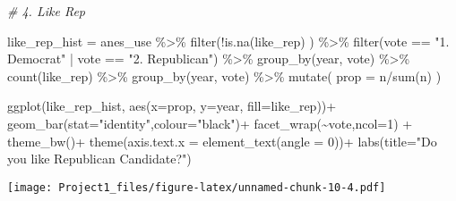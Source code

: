 \documentclass[
]{article}
\newenvironment{Shaded}{\begin{snugshade}}{\end{snugshade}}
\newcommand{\AttributeTok}[1]{\textcolor[rgb]{0.77,0.63,0.00}{#1}}
\newcommand{\CommentTok}[1]{\textcolor[rgb]{0.56,0.35,0.01}{\textit{#1}}}
\newcommand{\DecValTok}[1]{\textcolor[rgb]{0.00,0.00,0.81}{#1}}
\newcommand{\FunctionTok}[1]{\textcolor[rgb]{0.00,0.00,0.00}{#1}}
\newcommand{\NormalTok}[1]{#1}
\newcommand{\OtherTok}[1]{\textcolor[rgb]{0.56,0.35,0.01}{#1}}
\newcommand{\SpecialCharTok}[1]{\textcolor[rgb]{0.00,0.00,0.00}{#1}}
\newcommand{\StringTok}[1]{\textcolor[rgb]{0.31,0.60,0.02}{#1}}
\begin{document}
\begin{Shaded}
\begin{Highlighting}[]
\CommentTok{\# 4. Like Rep}

\NormalTok{like\_rep\_hist }\OtherTok{=}\NormalTok{ anes\_use }\SpecialCharTok{\%\textgreater{}\%}
  \FunctionTok{filter}\NormalTok{(}\SpecialCharTok{!}\FunctionTok{is.na}\NormalTok{(like\_rep) ) }\SpecialCharTok{\%\textgreater{}\%}
  \FunctionTok{filter}\NormalTok{(vote }\SpecialCharTok{==} \StringTok{"1. Democrat"} \SpecialCharTok{|}\NormalTok{ vote }\SpecialCharTok{==} \StringTok{"2. Republican"}\NormalTok{) }\SpecialCharTok{\%\textgreater{}\%}
  \FunctionTok{group\_by}\NormalTok{(year, vote) }\SpecialCharTok{\%\textgreater{}\%}
  \FunctionTok{count}\NormalTok{(like\_rep) }\SpecialCharTok{\%\textgreater{}\%}
  \FunctionTok{group\_by}\NormalTok{(year, vote) }\SpecialCharTok{\%\textgreater{}\%}
  \FunctionTok{mutate}\NormalTok{(}
    \AttributeTok{prop =}\NormalTok{ n}\SpecialCharTok{/}\FunctionTok{sum}\NormalTok{(n)}
\NormalTok{  )}

\FunctionTok{ggplot}\NormalTok{(like\_rep\_hist,}
       \FunctionTok{aes}\NormalTok{(}\AttributeTok{x=}\NormalTok{prop, }\AttributeTok{y=}\NormalTok{year, }\AttributeTok{fill=}\NormalTok{like\_rep))}\SpecialCharTok{+}
  \FunctionTok{geom\_bar}\NormalTok{(}\AttributeTok{stat=}\StringTok{"identity"}\NormalTok{,}\AttributeTok{colour=}\StringTok{"black"}\NormalTok{)}\SpecialCharTok{+}
  \FunctionTok{facet\_wrap}\NormalTok{(}\SpecialCharTok{\textasciitilde{}}\NormalTok{vote,}\AttributeTok{ncol=}\DecValTok{1}\NormalTok{) }\SpecialCharTok{+}
  \FunctionTok{theme\_bw}\NormalTok{()}\SpecialCharTok{+}
  \FunctionTok{theme}\NormalTok{(}\AttributeTok{axis.text.x =} \FunctionTok{element\_text}\NormalTok{(}\AttributeTok{angle =} \DecValTok{0}\NormalTok{))}\SpecialCharTok{+}
  \FunctionTok{labs}\NormalTok{(}\AttributeTok{title=}\StringTok{"Do you like Republican Candidate?"}\NormalTok{)}
\end{Highlighting}
\end{Shaded}

\texttt{[image: Project1\_files/figure-latex/unnamed-chunk-10-4.pdf]}
\end{document}

